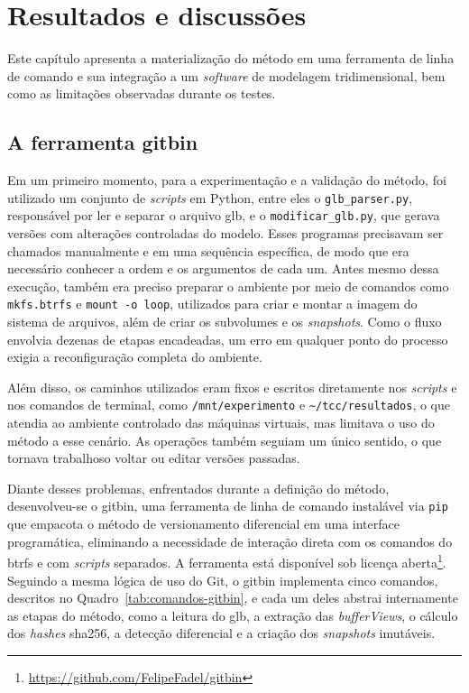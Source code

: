 \chapter{Resultados e discussões}\label{cap:resultados}

Este capítulo apresenta a materialização do método em uma ferramenta de linha de comando e sua integração a um \textit{software} de modelagem tridimensional, bem como as limitações observadas durante os testes.

\section{A ferramenta gitbin}\label{sec:gitbin}

Em um primeiro momento, para a experimentação e a validação do método, foi utilizado um conjunto de \textit{scripts} em Python, entre eles o \texttt{glb\_parser.py}, responsável por ler e separar o arquivo \gls{glb}, e o \texttt{modificar\_glb.py}, que gerava versões com alterações controladas do modelo. Esses programas precisavam ser chamados manualmente e em uma sequência específica, de modo que era necessário conhecer a ordem e os argumentos de cada um. Antes mesmo dessa execução, também era preciso preparar o ambiente por meio de comandos como \texttt{mkfs.btrfs} e \texttt{mount -o loop}, utilizados para criar e montar a imagem do sistema de arquivos, além de criar os subvolumes e os \textit{snapshots}. Como o fluxo envolvia dezenas de etapas encadeadas, um erro em qualquer ponto do processo exigia a reconfiguração completa do ambiente.

Além disso, os caminhos utilizados eram fixos e escritos diretamente nos \textit{scripts} e nos comandos de terminal, como \texttt{/mnt/experimento} e \texttt{\textasciitilde/tcc/resultados}, o que atendia ao ambiente controlado das máquinas virtuais, mas limitava o uso do método a esse cenário. As operações também seguiam um único sentido, o que tornava trabalhoso voltar ou editar versões passadas.

Diante desses problemas, enfrentados durante a definição do método, desenvolveu-se o gitbin, uma ferramenta de linha de comando instalável via \texttt{pip} que empacota o método de versionamento diferencial em uma interface programática, eliminando a necessidade de interação direta com os comandos do \gls{btrfs} e com \textit{scripts} separados. A ferramenta está disponível sob licença aberta\footnote{\url{https://github.com/FelipeFadel/gitbin}}. Seguindo a mesma lógica de uso do Git, o gitbin implementa cinco comandos, descritos no Quadro~\ref{tab:comandos-gitbin}, e cada um deles abstrai internamente as etapas do método, como a leitura do \gls{glb}, a extração das \textit{bufferViews}, o cálculo dos \textit{hashes} \gls{sha256}, a detecção diferencial e a criação dos \textit{snapshots} imutáveis.

